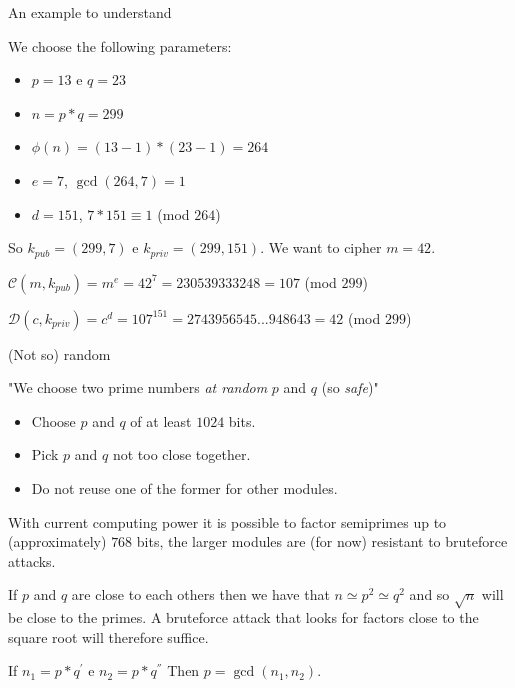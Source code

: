 \documentclass[handout, xcolor=dvipsnames,aspectratio=169]{beamer}
\begin{document}
\begin{frame}{An example to understand}

  \pause

  We choose the following parameters:

  \begin{itemize}
    \item $p = 13$ e $q = 23$
    \item $n = p*q = 299$
    \item $\phi(n) = (13-1)*(23-1) = 264$
    \item $e = 7$, $\gcd(264, 7) = 1$
    \item $d = 151$, $7*151 \equiv 1 $ (mod $264$)
  \end{itemize}

  \smallskip

  \pause

  So $k_{pub} = (299, 7)$ e $k_{priv} = (299, 151)$. We want to cipher $m = 42$.

  \pause

  \medskip

  $\mathcal{C}(m, k_{pub}) = m^{e} = 42^7 = 230539333248 = 107$ (mod $299$)

  \pause

  $\mathcal{D}(c, k_{priv}) = c^{d} = 107^{151} = 2743956545...948643 = 42 $ (mod $299$)

\end{frame}

\begin{frame}{(Not so) random}

  \pause

  "We choose two prime numbers \textit {at random} $p$ and $q$ (so \textit{safe})"

  \begin{itemize}
    \item Choose $ p $ and $ q $ of at least $ 1024 $ bits.
    \item Pick $ p $ and $ q $ not too close together.
    \item Do not reuse one of the former for other modules.
  \end{itemize}

  \smallskip
  \pause
  With current computing power it is possible to factor semiprimes up to (approximately) $ 768 $ bits, the larger modules are (for now) resistant to bruteforce attacks.

  \smallskip
  \pause
  If $p$ and $q$ are close to each others then we have that $n \simeq p^2 \simeq q^2$ and so $\sqrt{n}$ will be close to the primes.
  A bruteforce attack that looks for factors close to the square root will therefore suffice.

  \smallskip
  \pause

  If $n_1 = p*q^{'}$ e $n_2 = p*q^{''}$ Then $p = \gcd(n_1, n_2)$.

\end{frame}
\end{document}
